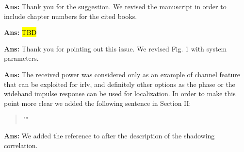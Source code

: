 \documentclass[draftcls,onecolumn,12pt]{IEEEtran}
\newcounter{revc}
\newcommand{\revp}[1]{\zref[revcontent]{#1}}
\begin{document}
{\bf Ans:} Thank you for the suggestion. We revised the manuscript in order to include chapter numbers for the cited books.

\vspace{5mm} %
\begin{framed}
\end{framed}

{\bf Ans:} \hl{TBD}

\vspace{5mm} %
\begin{framed}
\end{framed}

{\bf Ans:} Thank you for pointing out this issue. We revised Fig. 1 with system parameters.

\vspace{5mm} %
\begin{framed}
\end{framed}

{\bf Ans:} The received power was considered only as an example of channel feature that can be exploited for \ac{irlv}, and definitely other options as the phase or the wideband impulse response can be used for localization. In order to make this point more clear we added the following sentence in Section II:
\begin{quote}
    "\revp{revPHASE}"
\end{quote}



\vspace{5mm} %
\begin{framed}
\end{framed}

{\bf Ans:} We added the reference to \cite[Chapter 2.7]{goldsmith2005} after the description of the shadowing correlation.

\vspace{5mm} %
\begin{framed}
\end{framed}
\end{document}
